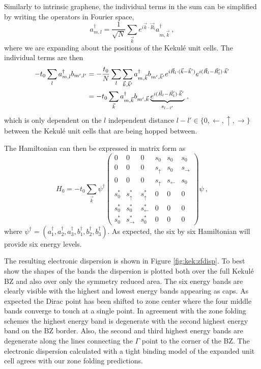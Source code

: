 Similarly to intrinsic graphene, the individual terms in the sum can be simplified by writing the operators in Fourier space,
\begin{equation}
	a_{m,l}^{\dagger}=\frac{1}{\sqrt{N}}\sum_{\vec{k}} e^{ i \vec{k}  \cdot \vec{R}_l} a_{m,\vec{k} }^{\dagger} \ ,
	\label{eq:kek:FT}
\end{equation}
where we are expanding about the positions of the Kekul\'e unit cells.
The individual terms are then
\begin{align*}
	-t_0 \sum_l a^{\dagger}_{m,l} b_{m',l'} &=
	    -\frac{t_0}{N}\sum_l \sum_{\vec{k},\vec{k}'} a^{\dagger}_{m,\vec{k}} b_{m',\vec{k}'} 
	    e^{i \vec{R}_l \cdot (\vec{k}-\vec{k}')} e^{i(\vec{R}_l-\vec{R}_l')\cdot \vec{k}'} \\
	    &= -t_0 \sum_{\vec{k}} a^{\dagger}_{m,\vec{k}} b_{m',\vec{k}} \underbrace{e^{i(\vec{R}_l-\vec{R}_l')\cdot \vec{k}'}}_{s_{l-l'}} \ ,
\end{align*}
which is only dependent on the $l$ independent distance $l-l' \in \{ 0,\leftarrow,\uparrow,\rightarrow \}$ between the Kekul\'e unit cells that are being hopped between.

The Hamiltonian can then be expressed in matrix form as
\begin{equation}
	H_0=-t_0 \sum_{\vec{k}} \psi^{\dagger} 
	\left(\begin{array}{cccccc}
		0     & 0                 & 0                & s_0          & s_0            & s_0 \\
		0     & 0                 & 0                & s_{\uparrow} & s_0            & s_{\rightarrow} \\
		0     & 0                 & 0                & s_{\uparrow} & s_{\leftarrow} & s_0 \\
		s_0^* & s_{\uparrow}^*    & s_{\uparrow}^*   & 0            & 0              & 0 \\
		s_0^* & s_0^*             & s_{\leftarrow}^* & 0            & 0              & 0 \\
		s_0^* & s_{\rightarrow}^* & s_0^*            & 0            & 0              & 0 
	\end{array}\right)
	\psi \ ,
	\label{eq:kek:Hzonefold}
\end{equation}
where $\psi^{\dagger}=\left( a^{\dagger}_1, a^{\dagger}_2, a^{\dagger}_3, b^{\dagger}_1, b^{\dagger}_2, b^{\dagger}_3 \right)$.
As expected, the six by six Hamiltonian will provide six energy levels.

The resulting electronic dispersion is shown in Figure \ref{fig:kek:zfdisp}.
To best show the shapes of the bands the dispersion is plotted both over the full Kekul\'e BZ and also over only the symmetry reduced area.
The six energy bands are clearly visible with the highest and lowest energy bands appearing as caps.
As expected the Dirac point has been shifted to zone center where the four middle bands converge to touch at a single point.
In agreement with the zone folding schemes the highest energy band is degenerate with the second highest energy band on the BZ border.
Also, the second and third highest energy bands are degenerate along the lines connecting the $\Gamma$ point to the corner of the BZ.
The electronic dispersion calculated with a tight binding model of the expanded unit cell agrees with our zone folding predictions.


